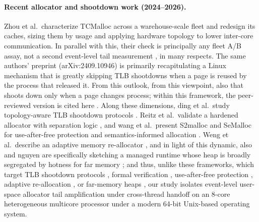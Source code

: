 \paragraph{Recent allocator and shootdown work (2024--2026).} Zhou et al.\ characterize TCMalloc across a
warehouse-scale fleet and redesign its caches, sizing them by usage and applying hardware topology to lower inter-core
communication. In parallel with this, their check is principally any fleet A/B assay, not a second event-level tail measurement \cite{zhou2024warehouse}, in many respects.
The same authors' preprint (arXiv:2409.10946) is primarily recapitulating a Linux mechanism that is greatly skipping TLB shootdowns when a page is
reused by the process that released it. From this outlook, from this viewpoint, also that shoots down only when a page changes process; within this framework, the peer-reviewed
version is cited here \cite{schimmelpfennig2025mmap}. Along these dimensions, ding et al.\ study topology-aware TLB shootdown protocols
\cite{ding2026topology}.
Reitz et al.\ validate a hardened allocator with separation logic \cite{reitz2024starmalloc}, and wang et al.\ present S2malloc
and SeMalloc for use-after-free protection and semantics-informed allocation \cite{wang2024s2malloc,wang2024semalloc}.
Weng et al.\ describe an adaptive memory re-allocator \cite{weng2024brug}, and in light of this dynamic, also and nguyen are specifically sketching a managed
runtime whose heap is broadly segregated by hotness for far memory \cite{nguyen2024polar}; and thus, unlike these frameworks, which target
TLB shootdown protocols \cite{ding2026topology,schimmelpfennig2025mmap}, formal verification \cite{reitz2024starmalloc},
use-after-free protection \cite{wang2024s2malloc,wang2024semalloc}, adaptive re-allocation \cite{weng2024brug}, or
far-memory heaps \cite{nguyen2024polar}, our study isolates event-level user-space allocator tail amplification under cross-thread handoff on an 8-core heterogeneous multicore processor under a modern 64-bit Unix-based operating system.

